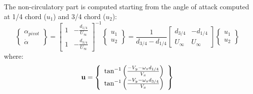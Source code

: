 The non-circulatory part is computed starting from the angle of attack
computed at 1/4 chord ($u_1$) and 3/4 chord ($u_2$):
\begin{equation}
\left\{
	\begin{array}{c}
		\alpha_{pivot} \\
		\dot{\alpha}
	\end{array}
\right\} = 
\left[
	\begin{array}{cc}
		1 & -\frac{d_{1/4}}{U_\infty}\\
		1 & -\frac{d_{3/4}}{U_\infty}
	\end{array}
\right]^{-1} 
\left\{
	\begin{array}{c}
		u_1 \\
		u_2
	\end{array}
\right\} = \frac{1}{d_{3/4}-d_{1/4}} 
\left[
	\begin{array}{cc}
		d_{3/4} & -d_{1/4}\\
		U_\infty & U_\infty
	\end{array}
\right]
\left\{
	\begin{array}{c}
		u_1 \\
		u_2
	\end{array}
\right\}
\end{equation}
where:
\begin{equation}
	\bm{\mathbf{u}} = \left\{ \begin{array}{c} 
		\tan^{-1} \left(  \frac{-V_y - \omega_z d_{1/4}}{V_x} \right)\\
		\tan^{-1} \left(  \frac{-V_y - \omega_z d_{3/4}}{V_x} \right)\\
	 \end{array} \right\}
\end{equation}


